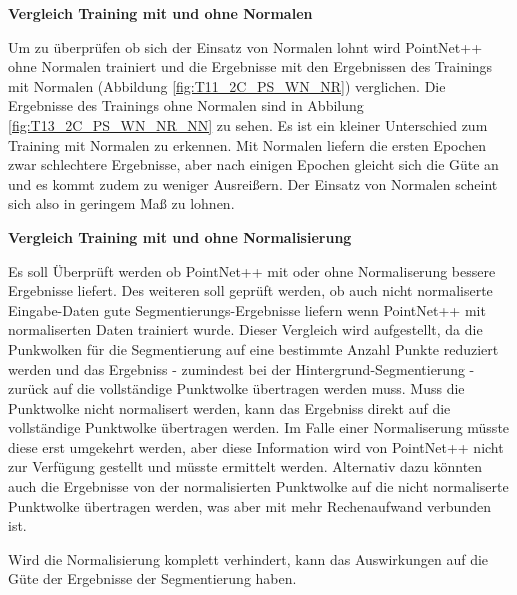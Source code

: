 \documentclass[12pt,titlepage, twoside]{article}
\begin{document}
\textbf{Vergleich Training mit und ohne Normalen}

Um zu überprüfen ob sich der Einsatz von Normalen lohnt wird PointNet++ ohne Normalen trainiert und die Ergebnisse mit den Ergebnissen des Trainings mit Normalen (Abbildung \ref{fig:T11_2C_PS_WN_NR}) verglichen. 
Die Ergebnisse des Trainings ohne Normalen sind in Abbilung \ref{fig:T13_2C_PS_WN_NR_NN} zu sehen. Es ist ein kleiner Unterschied zum Training mit Normalen zu erkennen. 
Mit Normalen liefern die ersten Epochen zwar schlechtere Ergebnisse, aber nach einigen Epochen gleicht sich die Güte an und es kommt zudem zu weniger Ausreißern. 
Der Einsatz von Normalen scheint sich also in geringem Maß zu lohnen. 

\textbf{Vergleich Training mit und ohne Normalisierung} 

Es soll Überprüft werden ob PointNet++ mit oder ohne Normaliserung bessere Ergebnisse liefert. 
Des weiteren soll geprüft werden, ob auch nicht normaliserte Eingabe-Daten gute Segmentierungs-Ergebnisse liefern wenn PointNet++ mit normaliserten Daten trainiert wurde.
Dieser Vergleich wird aufgestellt, da die Punkwolken für die Segmentierung auf eine bestimmte Anzahl Punkte reduziert werden und das Ergebniss - zumindest bei der Hintergrund-Segmentierung - zurück auf die vollständige Punktwolke übertragen werden muss.
Muss die Punktwolke nicht normalisert werden, kann das Ergebniss direkt auf die vollständige Punktwolke übertragen werden. 
Im Falle einer Normaliserung müsste diese erst umgekehrt werden, aber diese Information wird von PointNet++ nicht zur Verfügung gestellt und müsste ermittelt werden.
Alternativ dazu könnten auch die Ergebnisse von der normalisierten Punktwolke auf die nicht normaliserte Punktwolke übertragen werden, was aber mit mehr Rechenaufwand verbunden ist.

Wird die Normalisierung komplett verhindert, kann das Auswirkungen auf die Güte der Ergebnisse der Segmentierung haben.
\end{document}
